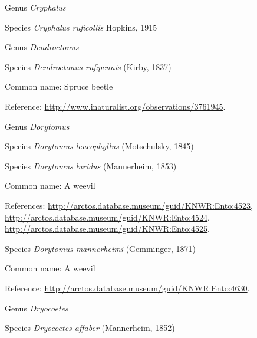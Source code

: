 \documentclass[9pt, article]{memoir}
\begin{document}
\begin{multicols}{2}
\vspace{6pt}\noindent\hspace{30pt}Genus \textit{Cryphalus}


\vspace{6pt}\noindent\hspace{36pt}Species \textit{Cryphalus ruficollis} Hopkins, 1915


\vspace{6pt}\noindent\hspace{30pt}Genus \textit{Dendroctonus}


\vspace{6pt}\noindent\hspace{36pt}Species \textit{Dendroctonus rufipennis} (Kirby, 1837)


Common name: Spruce beetle

Reference: 
\url{http://www.inaturalist.org/observations/3761945}.

\vspace{6pt}\noindent\hspace{30pt}Genus \textit{Dorytomus}


\vspace{6pt}\noindent\hspace{36pt}Species \textit{Dorytomus leucophyllus} (Motschulsky, 1845)


\vspace{6pt}\noindent\hspace{36pt}Species \textit{Dorytomus luridus} (Mannerheim, 1853)


Common name: A weevil

References: 
\url{http://arctos.database.museum/guid/KNWR:Ento:4523}, 
\url{http://arctos.database.museum/guid/KNWR:Ento:4524}, 
\url{http://arctos.database.museum/guid/KNWR:Ento:4525}.

\vspace{6pt}\noindent\hspace{36pt}Species \textit{Dorytomus mannerheimi} (Gemminger, 1871)


Common name: A weevil

Reference: 
\url{http://arctos.database.museum/guid/KNWR:Ento:4630}.

\vspace{6pt}\noindent\hspace{30pt}Genus \textit{Dryocoetes}


\vspace{6pt}\noindent\hspace{36pt}Species \textit{Dryocoetes affaber} (Mannerheim, 1852)



\end{multicols}
\end{document}
